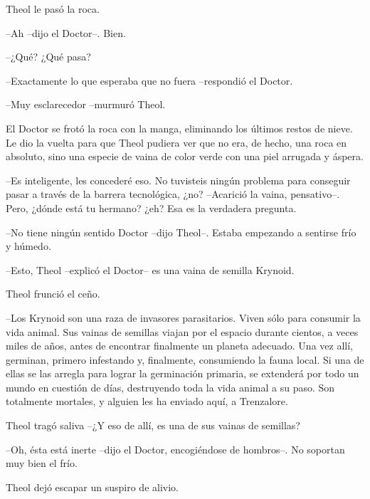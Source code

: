 Theol le pasó la roca.



--Ah --dijo el Doctor--. Bien.



--¿Qué? ¿Qué pasa?



--Exactamente lo que esperaba que no fuera --respondió el Doctor.



--Muy esclarecedor --murmuró Theol.



El Doctor se frotó la roca con la manga, eliminando los últimos restos de nieve. Le dio la vuelta para que Theol pudiera ver que no era, de hecho, una roca en absoluto, sino una especie de vaina de color verde con una piel arrugada y áspera.

--Es inteligente, les concederé eso. No tuvisteis ningún problema para conseguir pasar a través de la barrera tecnológica, ¿no? --Acarició la vaina, pensativo--. Pero, ¿dónde está tu hermano? ¿eh? Esa es la verdadera pregunta.


--No tiene ningún sentido Doctor --dijo Theol--. Estaba empezando a sentirse frío y húmedo.



--Esto, Theol --explicó el Doctor-- es una vaina de semilla Krynoid.



Theol frunció el ceño.



--Los Krynoid son una raza de invasores parasitarios. Viven sólo para consumir la vida animal. Sus vainas de semillas viajan por el espacio durante cientos, a veces miles de años, antes de encontrar finalmente un planeta adecuado. Una vez allí, germinan, primero infestando y, finalmente, consumiendo la fauna local. Si una de ellas se las arregla para lograr la germinación primaria, se extenderá por todo un mundo en cuestión de días, destruyendo toda la vida animal a su paso. Son totalmente mortales, y alguien les ha enviado aquí, a Trenzalore.



Theol tragó saliva --¿Y eso de allí, es una de sus vainas de semillas?



--Oh, ésta está inerte --dijo el Doctor, encogiéndose de hombros--. No soportan muy bien el frío.



Theol dejó escapar un suspiro de alivio.

